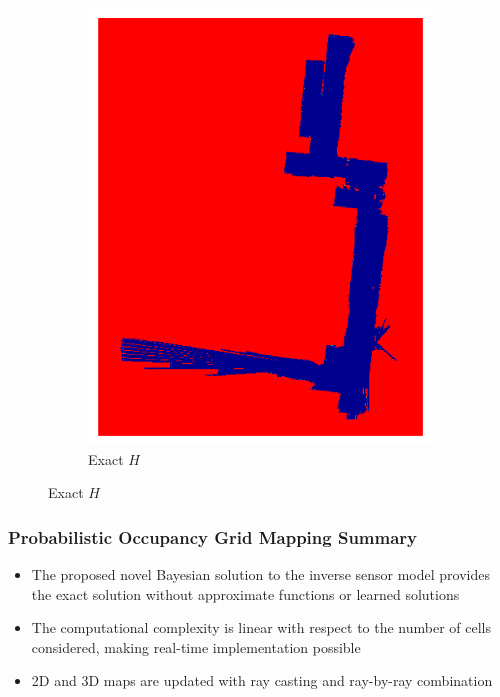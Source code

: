 \documentclass[11pt,professionalfonts,hyperref={pdftex,pdfpagemode=none,pdfstartview=FitH}]{beamer}
\begin{document}
\begin{frame}
\begin{figure}[!htbp]
\begin{subfigure}{0.2\textwidth}
        \includegraphics[width=\textwidth]{EISM_Image_inf_19.pdf}
        \caption*{Exact $H$}
    \end{subfigure}
\end{figure}

\end{frame}

\begin{frame}
\frametitle{Probabilistic Occupancy Grid Mapping Summary}

\begin{itemize}
	\item The proposed novel Bayesian solution to the inverse sensor model provides the exact solution without approximate functions or learned solutions
	\item The computational complexity is linear with respect to the number of cells considered, making real-time implementation possible
	\item 2D and 3D maps are updated with ray casting and ray-by-ray combination
\end{itemize}

\end{frame}
\end{document}
